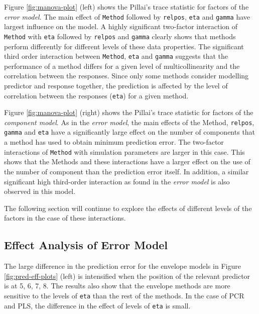 \documentclass[review]{elsarticle}
\providecommand{\tightlist}{%
  \setlength{\itemsep}{0pt}\setlength{\parskip}{0pt}}
\begin{document}
\begin{description}
\tightlist
\item[Error Model:]
Figure \ref{fig:manova-plot} (left) shows the Pillai's trace statistic
for factors of the \emph{error model}. The main effect of
\texttt{Method} followed by \texttt{relpos}, \texttt{eta} and
\texttt{gamma} have largest influence on the model. A highly significant
two-factor interaction of \texttt{Method} with \texttt{eta} followed by
\texttt{relpos} and \texttt{gamma} clearly shows that methods perform
differently for different levels of these data properties. The
significant third order interaction between \texttt{Method},
\texttt{eta} and \texttt{gamma} suggests that the performance of a
method differs for a given level of multicollinearity and the
correlation between the responses. Since only some methods consider
modelling predictor and response together, the prediction is affected by
the level of correlation between the responses (\texttt{eta}) for a
given method.
\item[Component Model:]
Figure \ref{fig:manova-plot} (right) shows the Pillai's trace statistic
for factors of the \emph{component model}. As in the \emph{error model},
the main effects of the Method, \texttt{relpos}, \texttt{gamma} and
\texttt{eta} have a significantly large effect on the number of
components that a method has used to obtain minimum prediction error.
The two-factor interactions of \texttt{Method} with simulation
parameters are larger in this case. This shows that the Methods and
these interactions have a larger effect on the use of the number of
component than the prediction error itself. In addition, a similar
significant high third-order interaction as found in the \emph{error
model} is also observed in this model.
\end{description}

The following section will continue to explore the effects of different
levels of the factors in the case of these interactions.

\subsection{Effect Analysis of Error
Model}\label{effect-analysis-of-error-model}

The large difference in the prediction error for the envelope models in
Figure \ref{fig:pred-eff-plots} (left) is intensified when the position
of the relevant predictor is at 5, 6, 7, 8. The results also show that
the envelope methods are more sensitive to the levels of \texttt{eta}
than the rest of the methods. In the case of PCR and PLS, the difference
in the effect of levels of \texttt{eta} is small.
\end{document}
